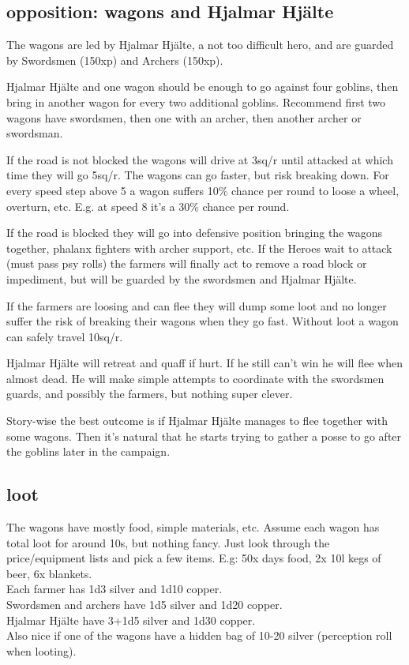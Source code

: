 \subsection*{opposition: wagons and Hjalmar Hjälte}

The wagons are led by Hjalmar Hjälte, a not too difficult hero, and are guarded by Swordsmen (150xp) and Archers (150xp).

Hjalmar Hjälte and one wagon should be enough to go against four goblins, then bring in another wagon for every two additional goblins. Recommend first two wagons have swordsmen, then one with an archer, then another archer or swordsman.

If the road is not blocked the wagons will drive at 3sq/r until attacked at which time they will go 5sq/r. The wagons can go faster, but risk breaking down. For every speed step above 5 a wagon suffers 10\% chance per round to loose a wheel, overturn, etc. E.g. at speed 8 it's a 30\% chance per round.

If the road is blocked they will go into defensive position bringing the wagons together, phalanx fighters with archer support, etc. If the Heroes wait to attack (must pass psy rolls) the farmers will finally act to remove a road block or impediment, but will be guarded by the swordsmen and Hjalmar Hjälte.

If the farmers are loosing and can flee they will dump some loot and no longer suffer the risk of breaking their wagons when they go fast. Without loot a wagon can safely travel 10sq/r.

Hjalmar Hjälte will retreat and quaff if hurt. If he still can't win he will flee when almost dead. He will make simple attempts to coordinate with the swordsmen guards, and possibly the farmers, but nothing super clever.

Story-wise the best outcome is if Hjalmar Hjälte manages to flee together with some wagons. Then it's natural that he starts trying to gather a posse to go after the goblins later in the campaign.


\subsection*{loot}

The wagons have mostly food, simple materials, etc. Assume each wagon has total loot for around 10s, but nothing fancy. Just look through the price/equipment lists and pick a few items. E.g: 50x days food, 2x 10l kegs of beer, 6x blankets.\\
Each farmer has 1d3 silver and 1d10 copper.\\
Swordsmen and archers have 1d5 silver and 1d20 copper.\\
Hjalmar Hjälte have 3+1d5 silver and 1d30 copper.\\
Also nice if one of the wagons have a hidden bag of 10-20 silver (perception roll when looting).

